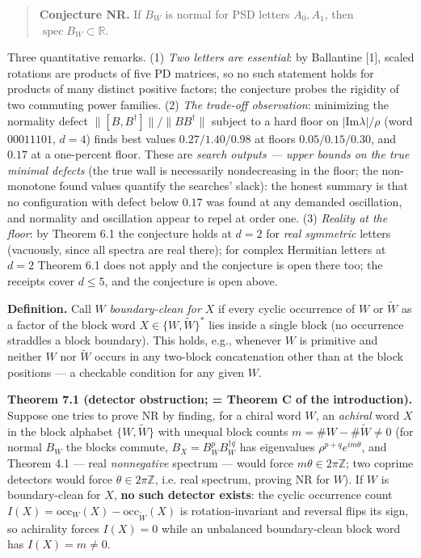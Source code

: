 \documentclass[11pt]{article}
\begin{document}
\begin{quote}
\textbf{Conjecture NR.}  If $B_W$ is normal for PSD letters $A_0, A_1$, then $\operatorname{spec} B_W \subset \mathbb R$.
\end{quote}
Three quantitative remarks.  (1) \emph{Two letters are essential}: by Ballantine [1], scaled rotations are products of five PD matrices, so no such statement holds for products of many distinct positive factors; the conjecture probes the rigidity of two commuting power families.  (2) \emph{The trade-off observation}: minimizing the normality defect $\|[B, B^{\dagger}]\|/\|BB^{\dagger}\|$ subject to a hard floor on $|\mathrm{Im}\lambda|/\rho$ (word $00011101$, $d = 4$) finds best values $0.27 / 1.40 / 0.98$ at floors $0.05 / 0.15 / 0.30$, and $0.17$ at a one-percent floor.  These are \emph{search outputs — upper bounds on the true minimal defects} (the true wall is necessarily nondecreasing in the floor; the non-monotone found values quantify the searches' slack): the honest summary is that no configuration with defect below $0.17$ was found at any demanded oscillation, and normality and oscillation appear to repel at order one.  (3) \emph{Reality at the floor}: by Theorem 6.1 the conjecture holds at $d = 2$ for \emph{real symmetric} letters (vacuously, since all spectra are real there); for complex Hermitian letters at $d = 2$ Theorem 6.1 does not apply and the conjecture is open there too; the receipts cover $d \le 5$, and the conjecture is open above.

\textbf{Definition.}  Call $W$ \emph{boundary-clean for $X$} if every cyclic occurrence of $W$ or $\widetilde W$ as a factor of the block word $X \in \{W, \widetilde W\}^*$ lies inside a single block (no occurrence straddles a block boundary).  This holds, e.g., whenever $W$ is primitive and neither $W$ nor $\widetilde W$ occurs in any two-block concatenation other than at the block positions — a checkable condition for any given $W$.

\textbf{Theorem 7.1 (detector obstruction; = Theorem C of the introduction).}  Suppose one tries to prove NR by finding, for a chiral word $W$, an \emph{achiral} word $X$ in the block alphabet $\{W, \widetilde W\}$ with unequal block counts $m = \#W - \#\widetilde W \neq 0$ (for normal $B_W$ the blocks commute, $B_X = B_W^p B_W^{\dagger q}$ has eigenvalues $\rho^{p+q}e^{im\theta}$, and Theorem 4.1 — real \emph{nonnegative} spectrum — would force $m\theta \in 2\pi\mathbb Z$; two coprime detectors would force $\theta \in 2\pi\mathbb Z$, i.e. real spectrum, proving NR for $W$).  If $W$ is boundary-clean for $X$, \textbf{no such detector exists}: the cyclic occurrence count $I(X) = \mathrm{occ}_W(X) - \mathrm{occ}_{\widetilde W}(X)$ is rotation-invariant and reversal flips its sign, so achirality forces $I(X) = 0$ while an unbalanced boundary-clean block word has $I(X) = m \neq 0$.
\end{document}
